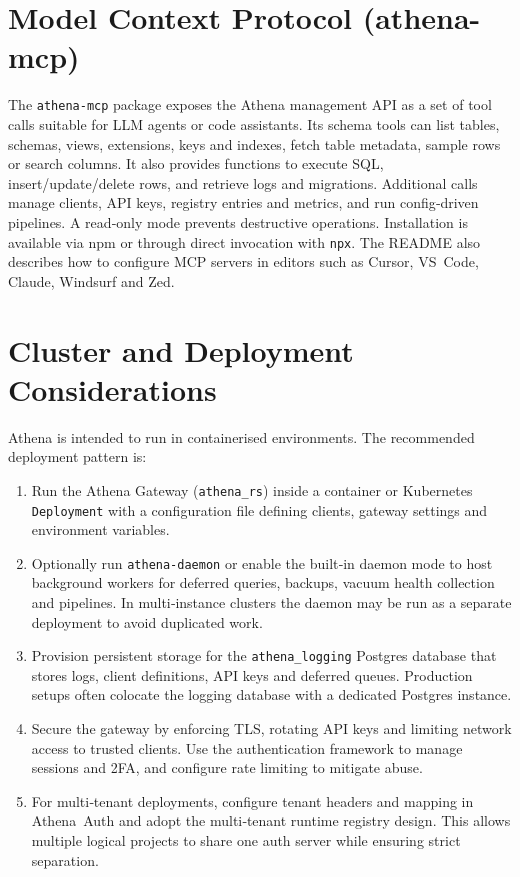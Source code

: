 \documentclass[11pt,a4paper]{article}
\begin{document}
\section{Model Context Protocol (athena-mcp)}

The \texttt{athena-mcp} package exposes the Athena management API as a set of tool calls suitable for LLM agents or code assistants.  Its schema tools can list tables, schemas, views, extensions, keys and indexes, fetch table metadata, sample rows or search columns.  It also provides functions to execute SQL, insert/update/delete rows, and retrieve logs and migrations.  Additional calls manage clients, API keys, registry entries and metrics, and run config‑driven pipelines.  A read‑only mode prevents destructive operations.  Installation is available via npm or through direct invocation with \texttt{npx}.  The README also describes how to configure MCP servers in editors such as Cursor, VS Code, Claude, Windsurf and Zed.

\section{Cluster and Deployment Considerations}

Athena is intended to run in containerised environments.  The recommended deployment pattern is:
\begin{enumerate}
  \item Run the Athena Gateway (\texttt{athena\_rs}) inside a container or Kubernetes \texttt{Deployment} with a configuration file defining clients, gateway settings and environment variables.
  \item Optionally run \texttt{athena-daemon} or enable the built‑in daemon mode to host background workers for deferred queries, backups, vacuum health collection and pipelines.  In multi‑instance clusters the daemon may be run as a separate deployment to avoid duplicated work.
  \item Provision persistent storage for the \texttt{athena_logging} Postgres database that stores logs, client definitions, API keys and deferred queues.  Production setups often colocate the logging database with a dedicated Postgres instance.
  \item Secure the gateway by enforcing TLS, rotating API keys and limiting network access to trusted clients.  Use the authentication framework to manage sessions and 2FA, and configure rate limiting to mitigate abuse.
  \item For multi‑tenant deployments, configure tenant headers and mapping in Athena Auth and adopt the multi‑tenant runtime registry design.  This allows multiple logical projects to share one auth server while ensuring strict separation.
\end{enumerate}
\end{document}
